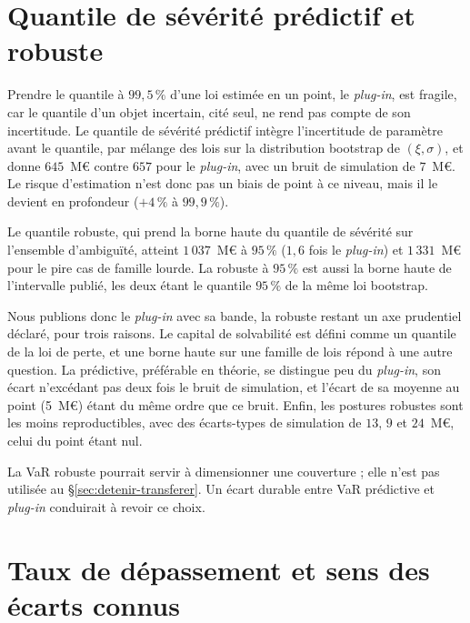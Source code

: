 
\section{Quantile de sévérité prédictif et robuste}
\label{sec:predictive-robuste}
\label{sec:posture-retenue}

Prendre le quantile à $99{,}5\,\%$ d'une loi estimée en un point, le \emph{plug-in}, est fragile,
car le quantile d'un objet incertain, cité seul, ne rend pas compte de son incertitude. Le quantile
de sévérité prédictif intègre
l'incertitude de paramètre avant le quantile, par mélange des lois sur la distribution bootstrap de
$(\xi,\sigma)$, et donne $645$~M\euro{} contre $657$ pour le \emph{plug-in}, avec un bruit de
simulation de $7$~M\euro{}. Le risque d'estimation n'est donc pas un biais de point à ce niveau, mais
il le devient en profondeur ($+4\,\%$ à $99{,}9\,\%$).

Le quantile robuste, qui prend la borne haute du quantile de sévérité sur l'ensemble d'ambiguïté, atteint
$1\,037$~M\euro{} à $95\,\%$ ($1{,}6$ fois le \emph{plug-in}) et $1\,331$~M\euro{} pour le pire cas
de famille lourde. La robuste à $95\,\%$ est aussi la borne haute de l'intervalle publié, les deux
étant le quantile $95\,\%$ de la même loi bootstrap.

Nous publions donc le \emph{plug-in} avec sa bande, la robuste restant un axe prudentiel déclaré,
pour trois raisons. Le capital de solvabilité est défini comme un quantile de la loi de perte, et une
borne haute sur une famille de lois répond à une autre question. La prédictive, préférable en théorie,
se distingue peu du \emph{plug-in}, son écart n'excédant pas deux fois le bruit de simulation, et l'écart de
sa moyenne au point (5~M\euro) étant du même ordre que ce bruit. Enfin, les postures
robustes sont les moins reproductibles, avec des écarts-types de simulation de $13$, $9$ et
$24$~M\euro{}, celui du point étant nul.

La VaR robuste pourrait servir à dimensionner une couverture ; elle n'est pas utilisée au \S\ref{sec:detenir-transferer}.
Un écart durable entre VaR prédictive et \emph{plug-in} conduirait à revoir ce choix.


\section{Taux de dépassement et sens des écarts connus}
\label{sec:pu-coherence}

